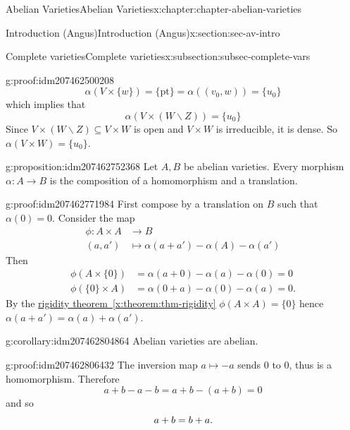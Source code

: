 \documentclass[oneside,10pt,]{book}
\newcommand{\qedhere}{\relax}
\numberwithin{equation}{section}
\newcommand{\amp}{&}
\begin{document}
\begin{chapterptx}{Abelian Varieties}{}{Abelian Varieties}{}{}{x:chapter:chapter-abelian-varieties}
\begin{sectionptx}{Introduction (Angus)}{}{Introduction (Angus)}{}{}{x:section:sec-av-intro}
\begin{subsectionptx}{Complete varieties}{}{Complete varieties}{}{}{x:subsection:subsec-complete-vars}
\begin{proofptx}{}{g:proof:idm207462500208}
\begin{equation*}
\alpha(V\times \{w\}) = \{\text{pt}\} = \alpha((v_0,w)) = \{u_0\}
\end{equation*}
which implies that%
\begin{equation*}
\alpha(V\times (W\smallsetminus Z)) = \{u_0\}
\end{equation*}
Since \(V\times (W\smallsetminus Z) \subseteq V\times W\) is open and \(V\times W\) is irreducible, it is dense. So \(\alpha(V\times W) = \{u_0\}\).%
\end{proofptx}
\begin{proposition}{}{}{g:proposition:idm207462752368}%
Let \(A,B\) be abelian varieties. Every morphism \(\alpha \colon A \to B \) is the composition of a homomorphism and a translation.%
\end{proposition}
\begin{proofptx}{}{g:proof:idm207462771984}
First compose by a translation on \(B\) such that \(\alpha(0) = 0\). Consider the map%
\begin{align*}
\phi \colon A\times A\amp\to B\\
(a,a')               \amp\mapsto \alpha(a+a') - \alpha(A) -\alpha(a')
\end{align*}
Then%
\begin{align*}
\phi(A\times\{0\}) \amp = \alpha(a+ 0) - \alpha(a) - \alpha(0) = 0\\
\phi(\{0\}\times A) \amp = \alpha(0+ a) - \alpha(0) - \alpha(a) = 0\text{.}
\end{align*}
By the \hyperref[x:theorem:thm-rigidity]{rigidity theorem~\ref{x:theorem:thm-rigidity}} \(\phi(A\times A) = \{0\}\) hence \(\alpha(a + a') = \alpha(a) + \alpha(a')\).%
\end{proofptx}
\begin{corollary}{}{}{g:corollary:idm207462804864}%
Abelian varieties are abelian.%
\end{corollary}
\begin{proofptx}{}{g:proof:idm207462806432}
The inversion map \(a \mapsto -a\) sends \(0\) to \(0\), thus is a homomorphism. Therefore%
\begin{equation*}
a+ b - a -b = a+b -(a+b) = 0
\end{equation*}
and so%
\begin{equation*}
a+b=b+a\text{.}\qedhere
\end{equation*}
%
\end{proofptx}
\end{subsectionptx}
\end{sectionptx}

\end{chapterptx}
\end{document}
